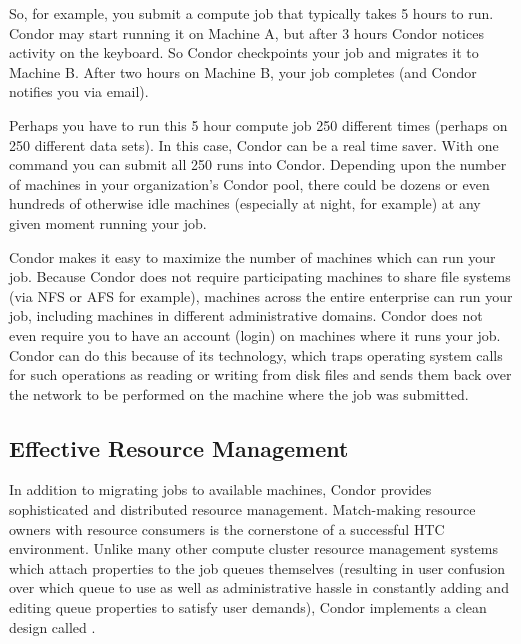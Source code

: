 So, for example, you submit a compute job that typically takes 5
hours to run. Condor may start running it on Machine A, but after 3
hours Condor notices activity on the keyboard. So Condor checkpoints
your job and migrates it to Machine B. After two hours on Machine B,
your job completes (and Condor notifies you via email). 

Perhaps you have to run this 5 hour compute job 250 different times
(perhaps on 250 different data sets). In this case, Condor can be a real
time saver. With one command you can submit all 250 runs into Condor.
Depending upon the number of machines in your organization's Condor
pool, there could be dozens or even hundreds of otherwise idle machines
(especially at night, for example) at any given moment running your
job. 

Condor makes it easy to maximize the number of machines which can run
your job. Because Condor does not require participating machines to
share file systems (via NFS or AFS for example), machines across the
entire enterprise can run your job, including machines in different
administrative domains. Condor does not even require you to have an
account (login) on machines where it runs your job. Condor can do this
because of its 
technology, which traps
operating system calls for such operations as reading or writing from disk
files and sends them back over the network to be performed on the machine
where the job was submitted. 

\subsection{Effective Resource Management}

In addition to migrating jobs to available machines, Condor provides
sophisticated and distributed resource management.
Match-making resource
owners with resource consumers is the cornerstone of a successful HTC
environment. Unlike many other compute cluster resource management
systems which attach properties to the job queues themselves (resulting
in user confusion over which queue to use as well as administrative
hassle in constantly adding and editing queue properties to satisfy user
demands), Condor implements a clean design called . 

